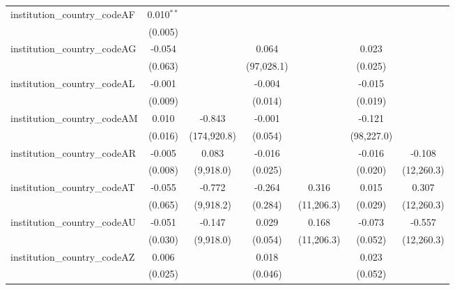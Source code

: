 \begin{tabular}{lcccccc}
   institution\_country\_codeAF          & 0.010$^{**}$   &               &               &              &              &   \\   
                                         & (0.005)        &               &               &              &              &   \\   
   institution\_country\_codeAG          & -0.054         &               & 0.064         &              & 0.023        &   \\   
                                         & (0.063)        &               & (97,028.1)    &              & (0.025)      &   \\   
   institution\_country\_codeAL          & -0.001         &               & -0.004        &              & -0.015       &   \\   
                                         & (0.009)        &               & (0.014)       &              & (0.019)      &   \\   
   institution\_country\_codeAM          & 0.010          & -0.843        & -0.001        &              & -0.121       &   \\   
                                         & (0.016)        & (174,920.8)   & (0.054)       &              & (98,227.0)   &   \\   
   institution\_country\_codeAR          & -0.005         & 0.083         & -0.016        &              & -0.016       & -0.108\\   
                                         & (0.008)        & (9,918.0)     & (0.025)       &              & (0.020)      & (12,260.3)\\   
   institution\_country\_codeAT          & -0.055         & -0.772        & -0.264        & 0.316        & 0.015        & 0.307\\   
                                         & (0.065)        & (9,918.2)     & (0.284)       & (11,206.3)   & (0.029)      & (12,260.3)\\   
   institution\_country\_codeAU          & -0.051         & -0.147        & 0.029         & 0.168        & -0.073       & -0.557\\   
                                         & (0.030)        & (9,918.0)     & (0.054)       & (11,206.3)   & (0.052)      & (12,260.3)\\   
   institution\_country\_codeAZ          & 0.006          &               & 0.018         &              & 0.023        &   \\   
                                         & (0.025)        &               & (0.046)       &              & (0.052)      &   \\   

\end{tabular}
